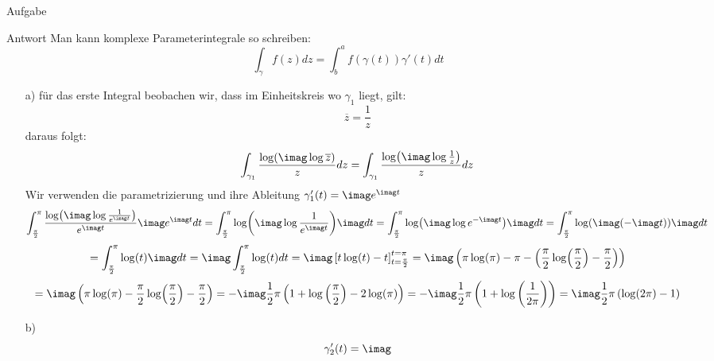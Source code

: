 \documentclass{scrartcl}
\begin{document}
\begin{section}{Aufgabe}
\begin{subsection}{Antwort}
    Man kann komplexe Parameterintegrale so schreiben: 
    \[\int_{\gamma}f(z)dz=\int_{b}^a f(\gamma(t))\gamma'(t) dt\]
\begin{itemize}
\item[a)]
    für das erste Integral beobachen wir, dass im Einheitskreis wo $\gamma_1$ liegt, gilt:
    \[\overline{z}=\frac{1}{z}\]
     daraus folgt:
     \[\int_{\gamma_1} \frac{\log(\imag \log \overline z)}{z} dz 
     =\int_{\gamma_1} \frac{\log(\imag \log \frac{1}{z})}{z} dz \]
     Wir verwenden die parametrizierung und ihre Ableitung $\gamma_1'(t)=\imag e^{\imag t}$
      \[\int_{\frac{\pi}{2}}^\pi \frac{\log(\imag \log \frac{1}{e^{\imag t}})}{e^{\imag t}} \imag e^{\imag t} dt 
      =\int_{\frac{\pi}{2}}^\pi \log(\imag \log \frac{1}{e^{\imag t}}) \imag dt 
      =\int_{\frac{\pi}{2}}^\pi \log(\imag \log e^{-\imag t}) \imag dt 
      =\int_{\frac{\pi}{2}}^\pi \log(\imag( -\imag t)) \imag dt 
      \]
      \[=\int_{\frac{\pi}{2}}^\pi \log(t) \imag dt
      = \imag\int_{\frac{\pi}{2}}^\pi \log(t) dt =\imag\left[t \log(t)-t\right]_{t=\frac{\pi}{2}}^{t=\pi}
      =\imag \left(\pi \log(\pi)-\pi-\left(\frac{\pi}{2} \log(\frac{\pi}{2})-\frac{\pi}{2}\right)\right)\]
      \[=\imag \left(\pi \log(\pi)-\frac{\pi}{2} \log(\frac{\pi}{2}) -\frac{\pi}{2}\right)
      =-\imag \frac{1}{2} \pi \left(1+\log \left(\frac{\pi }{2}\right)-2 \log (\pi )\right)
      =-\imag \frac{1}{2} \pi  \left(1+\log \left(\frac{1}{2 \pi }\right)\right)
      =\imag \frac{1}{2} \pi \left(\log(2\pi)-1\right)
      \]
 \item[b)]
 \[\gamma_2'(t)=\imag\]


\end{itemize}
\end{subsection}
\end{section}
\end{document}
